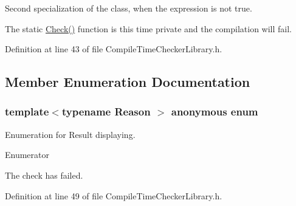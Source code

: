 Second specialization of the class, when the expression is not true. 

The static \hyperlink{class_compile_check_3_01false_00_01_reason_01_4_a1da45a656d0ba16e65e757aa3492c1da}{Check()} function is this time private and the compilation will fail. 

Definition at line 43 of file Compile\-Time\-Checker\-Library.\-h.



\subsection{Member Enumeration Documentation}
\hypertarget{class_compile_check_3_01false_00_01_reason_01_4_a7777002f83cd288663fad3eba2721a9b}{\subsubsection[{anonymous enum}]{\setlength{\rightskip}{0pt plus 5cm}template$<$typename Reason $>$ anonymous enum\hspace{0.3cm}{\ttfamily [private]}}}\label{class_compile_check_3_01false_00_01_reason_01_4_a7777002f83cd288663fad3eba2721a9b}


Enumeration for Result displaying. 

\begin{Desc}
\item[Enumerator]\par
\begin{description}
\item[{\em 
\hypertarget{class_compile_check_3_01false_00_01_reason_01_4_a7777002f83cd288663fad3eba2721a9ba9f7df94908ad6f5f6296d4bb2e8e0e3f}{Result}\label{class_compile_check_3_01false_00_01_reason_01_4_a7777002f83cd288663fad3eba2721a9ba9f7df94908ad6f5f6296d4bb2e8e0e3f}
}]The check has failed. \end{description}
\end{Desc}


Definition at line 49 of file Compile\-Time\-Checker\-Library.\-h.



